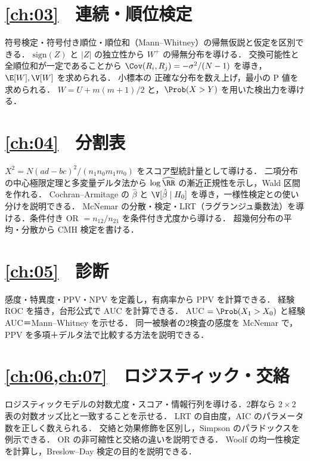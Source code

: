 \section*{\cref{ch:03}　連続・順位検定}
\begin{itemize}
\chk 符号検定・符号付き順位・順位和（Mann--Whitney）の帰無仮説と仮定を区別できる．
\chk $\mathrm{sign}(Z)$ と $|Z|$ の独立性から $W^+$ の帰無分布を導ける．
\chk 交換可能性と全順位和が一定であることから $\Cov(R_i,R_j)=-\sigma^2/(N-1)$ を導き，$\E[W],\V[W]$ を求められる．
\chk 小標本の 正確な分布を数え上げ，最小の P 値を求められる．
\chk $W=U+m(m+1)/2$ と，$\Prob(X>Y)$ を用いた検出力を導ける．
\end{itemize}
\section*{\cref{ch:04}　分割表}
\begin{itemize}
\chk $X^2=N(ad-bc)^2/(n_1n_0m_1m_0)$ をスコア型統計量として導ける．
\chk 二項分布の中心極限定理と多変量デルタ法から $\log\widehat{\RR}$ の漸近正規性を示し，Wald 区間を作れる．
\chk Cochran--Armitage の $\hat\beta$ と $\V[\hat\beta\mid H_0]$ を導き，一様性検定との使い分けを説明できる．
\chk McNemar の分散・検定・LRT（ラグランジュ乗数法）を導ける．条件付き OR $=n_{12}/n_{21}$ を条件付き尤度から導ける．
\chk 超幾何分布の平均・分散から CMH 検定を書ける．
\end{itemize}
\section*{\cref{ch:05}　診断}
\begin{itemize}
\chk 感度・特異度・PPV・NPV を定義し，有病率から PPV を計算できる．
\chk 経験 ROC を描き，台形公式で AUC を計算できる．
\chk AUC $=\Prob(X_1>X_0)$ と経験 AUC＝Mann--Whitney を示せる．
\chk 同一被験者の2検査の感度を McNemar で，PPV を多項＋デルタ法で比較する方法を説明できる．
\end{itemize}
\section*{\cref{ch:06,ch:07}　ロジスティック・交絡}
\begin{itemize}
\chk ロジスティックモデルの対数尤度・スコア・情報行列を導ける．2群なら $2\times2$ 表の対数オッズ比と一致することを示せる．
\chk LRT の自由度，AIC のパラメータ数を正しく数えられる．
\chk 交絡と効果修飾を区別し，Simpson のパラドックスを例示できる．
\chk OR の非可縮性と交絡の違いを説明できる．
\chk Woolf の均一性検定を計算し，Breslow--Day 検定の目的を説明できる．
\end{itemize}

